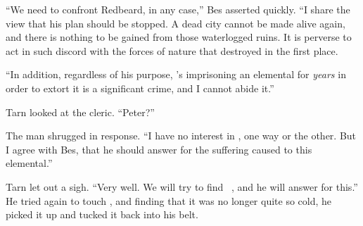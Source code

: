 ``We need to confront \mothzam Redbeard, in any case,'' Bes asserted quickly.  ``I share the view that his plan should be stopped.  A dead city cannot be made alive again, and there is nothing to be gained from those waterlogged ruins.  It is perverse to act in such discord with the forces of nature that destroyed \atmudarant in the first place.

``In addition, regardless of his purpose, \mothzam's imprisoning an elemental for \emph{years} in order to extort it is a significant crime, and I cannot abide it.''

Tarn looked at the cleric.  ``Peter?''

The man shrugged in response.  ``I have no interest in \atmudarant, one way or the other.  But I agree with Bes, that he should answer for the suffering caused to this elemental.''

Tarn let out a sigh.  ``Very well.  We will try to find \mothzam\ \driktur, and he will answer for this.''  He tried again to touch \kildir, and finding that it was no longer quite so cold, he picked it up and tucked it back into his belt.

